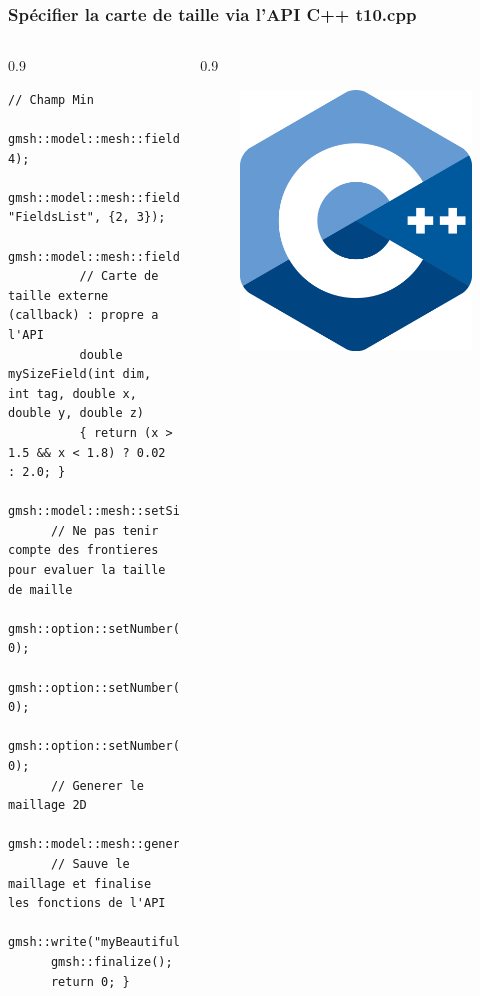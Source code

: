 \documentclass[aspectratio=169]{beamer}
\begin{document}
\begin{frame}[fragile]
\frametitle{Spécifier la carte de taille via l'API C++ \hfill t10.cpp}
  \footnotesize
  \begin{columns}
    \begin{column}{0.9\linewidth}
    \begin{lstlisting}[frame=none, aboveskip=-0.6mm]
      // Champ Min
      gmsh::model::mesh::field::add("Min", 4);
      gmsh::model::mesh::field::setNumbers(4, "FieldsList", {2, 3});
      gmsh::model::mesh::field::setAsBackgroundMesh(4);
          // Carte de taille externe (callback) : propre a l'API
          double mySizeField(int dim, int tag, double x, double y, double z)
          { return (x > 1.5 && x < 1.8) ? 0.02 : 2.0; }
      gmsh::model::mesh::setSizeCallback(mySizeField);
      // Ne pas tenir compte des frontieres pour evaluer la taille de maille
      gmsh::option::setNumber("Mesh.MeshSizeExtendFromBoundary", 0);
      gmsh::option::setNumber("Mesh.MeshSizeFromPoints", 0);
      gmsh::option::setNumber("Mesh.MeshSizeFromCurvature", 0);
      // Generer le maillage 2D
      gmsh::model::mesh::generate(2);
      // Sauve le maillage et finalise les fonctions de l'API
      gmsh::write("myBeautifulMesh.msh");
      gmsh::finalize();
      return 0; }
    \end{lstlisting}
    \end{column}
    \begin{column}{0.9\linewidth}
      \begin{figure}
        \vspace{-5.5cm}
        \hspace{-8cm}
        \includegraphics[width=0.1\linewidth]{figures/cpp.png}
        \caption{}
        \label{}
      \end{figure}
    \end{column}
  \end{columns}
\end{frame}
\end{document}
